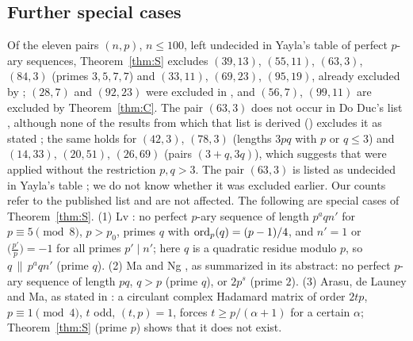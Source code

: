 \subsection{Further special cases}\label{ssec:known}
Of the eleven pairs $(n,p)$, $n\le100$, left undecided in Yayla's table
\cite{Yayla2016} of perfect $p$-ary sequences, Theorem~\ref{thm:S}
excludes $(39,13)$, $(55,11)$, $(63,3)$, $(84,3)$ (primes $3,5,7,7$) and
$(33,11)$, $(69,23)$, $(95,19)$, already excluded by
\cite[Thm.~6.5]{LeungSchmidtZhang2023}; $(28,7)$ and $(92,23)$ were
excluded in \cite{FengXiang2008}, and $(56,7)$, $(99,11)$ are excluded by
Theorem~\ref{thm:C}. The pair $(63,3)$ does not occur in Do Duc's list
\cite[Remark~3.13]{DoDuc2019}, although none of the results from which
that list is derived (\cite[Results~1.1--1.4, Thms.~3.2, 3.3, 3.7,
3.11]{DoDuc2019}) excludes it as stated ; the same holds for
$(42,3)$, $(78,3)$ (lengths $3pq$ with $p$ or $q\le3$) and $(14,33)$,
$(20,51)$, $(26,69)$ (pairs $(3+q,3q)$), which suggests that
\cite[Results~1.1(2),(3)]{DoDuc2019} were applied without the restriction
$p,q>3$. The pair $(63,3)$ is listed as undecided in Yayla's table
\cite{Yayla2016}; we do not know whether it was excluded earlier. Our
counts refer to the published list and are not affected. The following are special cases of
Theorem~\ref{thm:S}. (1) Lv \cite[Thm.~1.3]{Lv2017}: no perfect $p$-ary
sequence of length $p^aqn'$ for $p\equiv5\pmod8$, $p>p_0$, primes $q$
with $\operatorname{ord}_p(q)=(p-1)/4$, and $n'=1$ or $\bigl(\frac{p'}{p}\bigr)=-1$
for all primes $p'\mid n'$; here $q$ is a quadratic residue modulo $p$,
so $q\,\|\,p^aqn'$ (prime $q$). (2) Ma and Ng \cite{MaNg2009}, as
summarized in its abstract: no perfect $p$-ary sequence of length $pq$,
$q>p$ (prime $q$), or $2p^s$ (prime $2$). (3) Arasu, de Launey and Ma,
as stated in \cite[Thm.~4.7]{Arasu2011}: a circulant complex Hadamard
matrix of order $2tp$, $p\equiv1\pmod4$, $t$ odd, $(t,p)=1$, forces
$t\ge p/(\alpha+1)$ for a certain $\alpha$; Theorem~\ref{thm:S} (prime
$p$) shows that it does not exist.
